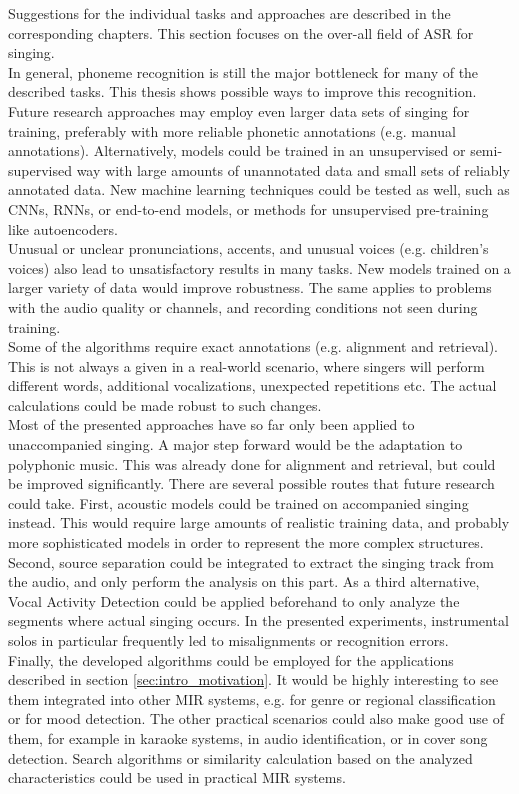 Suggestions for the individual tasks and approaches are described in the corresponding chapters. This section focuses on the over-all field of ASR for singing.\\
In general, phoneme recognition is still the major bottleneck for many of the described tasks. This thesis shows possible ways to improve this recognition. Future research approaches may employ even larger data sets of singing for training, preferably with more reliable phonetic annotations (e.g. manual annotations). Alternatively, models could be trained in an unsupervised or semi-supervised way with large amounts of unannotated data and small sets of reliably annotated data. New machine learning techniques could be tested as well, such as CNNs, RNNs, or end-to-end models, or methods for unsupervised pre-training like autoencoders.\\
Unusual or unclear pronunciations, accents, and unusual voices (e.g. children's voices) also lead to unsatisfactory results in many tasks. New models trained on a larger variety of data would improve robustness. The same applies to problems with the audio quality or channels, and recording conditions not seen during training.\\

Some of the algorithms require exact annotations (e.g. alignment and retrieval). This is not always a given in a real-world scenario, where singers will perform different words, additional vocalizations, unexpected repetitions etc. The actual calculations could be made robust to such changes.\\

Most of the presented approaches have so far only been applied to unaccompanied singing. A major step forward would be the adaptation to polyphonic music. This was already done for alignment and retrieval, but could be improved significantly. There are several possible routes that future research could take. First, acoustic models could be trained on accompanied singing instead. This would require large amounts of realistic training data, and probably more sophisticated models in order to represent the more complex structures. Second, source separation could be integrated to extract the singing track from the audio, and only perform the analysis on this part. As a third alternative, Vocal Activity Detection could be applied beforehand to only analyze the segments where actual singing occurs. In the presented experiments, instrumental solos in particular frequently led to misalignments or recognition errors.\\

Finally, the developed algorithms could be employed for the applications described in section \ref{sec:intro_motivation}. It would be highly interesting to see them integrated into other MIR systems, e.g. for genre or regional classification or for mood detection. The other practical scenarios could also make good use of them, for example in karaoke systems, in audio identification, or in cover song detection. Search algorithms or similarity calculation based on the analyzed characteristics could be used in practical MIR systems.
